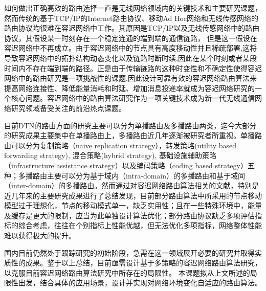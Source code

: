 \begin{introduction}
如何做出正确高效的路由选择一直是无线网络领域内的关键技术和主要研究课题，然而传统的基于TCP/IP的Internet路由协议、移动Ad Hoc网络和无线传感网络的路由协议均很难在容迟网络中工作。其原因是TCP/IP以及无线传感网络中的路由协议，其假设某一时刻存在一个稳定连通的端到端的通信链路， 但是这一假设在容迟网络中不再成立。由于容迟网络中的节点具有高度移动性并且稀疏部署,这将导致容迟网络中的拓扑结构动态变化以及链路时断时续,因此在某个时刻或者某段时间内不存在端到端的路径。正是由于传输链路的这种时变性和不确定性使得容迟网络中的路由研究是一项挑战性的课题,因此设计可靠有效的容迟网络路由算法来提高网络连接性、降低能量消耗和时延、增加消息投递率就成为容迟网络研究的一个核心问题。容迟网络中的路由算法研究作为一项关键技术成为新一代无线通信网络研究领域备受关注的前沿热点课题。

    目前DTN的路由方面的研究主要可以分为单播路由及多播路由两类，迄今大部分的研究成果主要集中在单播路由上，多播路由近几年逐渐被研究者所重视。单播路由可以分为复制策略（naive replication strategy），转发策略(utility based forwarding strategy), 混合策略(hybrid strategy), 基础设施辅助策略（infrastructure assistance strategy）以及编码策略（coding based strategy）五种；多播路由主要可以分为基于域内（intra-domain）的多播路由和基于域间（inter-domain）的多播路由。然而通过对容迟网络路由算法相关的文献，特别是近几年来的主要研究成果进行了总结发现，目前部分路由算法中所采用的节点移动模型过于理想化，节点的移动模式单一，缺乏实用性；且在一些特殊环境中，能量及缓存是更大的限制，应当为此单独设计算法优化；部分路由协议缺乏多项评估指标的综合考虑，往往在个别指标上性能优越，但无法优化多项指标，网络整体性能难以获得极大的提升。 

    国内目前仍然处于跟踪研究的初始阶段，急需在这一领域展开必要的研究并取得实质性的成果。鉴于以上总结，目前亟需设计基于多策略的容迟网络路由算法研究，以克服目前容迟网络路由算法研究中所存在的局限性。 本课题拟从上文所述的局限性出发，结合具体的应用场景，设计并实现对网络环境变化自适应的路由算法。




\end{introduction}
